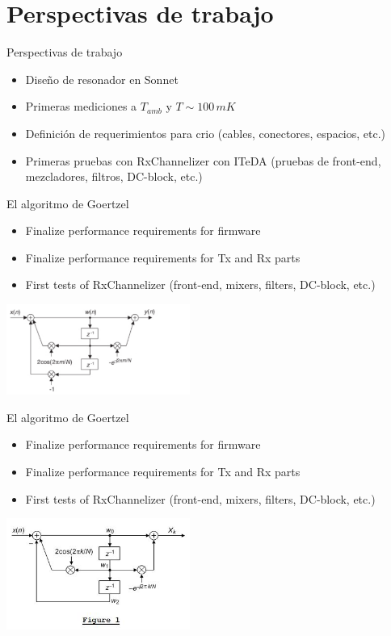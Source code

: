 \documentclass[ignorenonframetext,12pt]{beamer}
\begin{document}
\section{Perspectivas de trabajo}
\begin{frame}{Perspectivas de trabajo}
				\begin{itemize}
								\item Dise\~no de resonador en Sonnet
								\item Primeras mediciones a $T_{amb}$ y $T \sim 100\,mK$
								\item Definici\'on de requerimientos para crio (cables,
												conectores, espacios, etc.)
								\item Primeras pruebas con RxChannelizer con ITeDA (pruebas de
												front-end, mezcladores, filtros, DC-block, etc.)
				\end{itemize}
\end{frame}
\begin{frame}{El algoritmo de Goertzel}
				\begin{itemize}
								\item Finalize performance requirements for firmware 
								\item Finalize performance requirements for Tx and Rx parts 
								\item First tests of RxChannelizer (front-end, mixers, filters,
												DC-block, etc.)
				\end{itemize}
								\centering
								\includegraphics[width=0.45\textwidth]{goertzel_algo}
\end{frame}

\begin{frame}{El algoritmo de Goertzel}
				\begin{itemize}
								\item Finalize performance requirements for firmware 
								\item Finalize performance requirements for Tx and Rx parts 
								\item First tests of RxChannelizer (front-end, mixers, filters,
												DC-block, etc.)
				\end{itemize}
								\centering
								\includegraphics[width=0.45\textwidth]{goertzel_non_integer_figure1}
\end{frame}
\end{document}
